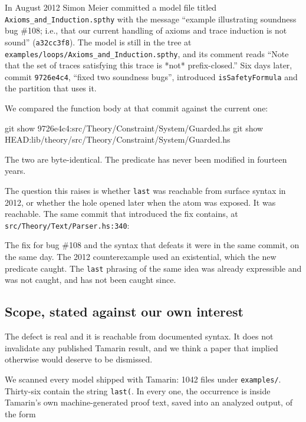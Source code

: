 \documentclass[version=preprint]{iacrcc}
\newcommand{\code}[1]{\texttt{\small #1}}
\theoremstyle{definition}
\theoremstyle{remark}
\begin{document}
In August 2012 Simon Meier committed a model file titled
\code{Axioms\_and\_Induction.spthy} with the message ``example illustrating
soundness bug \#108; i.e., that our current handling of axioms and trace
induction is not sound'' (\code{a32cc3f8}). The model is still in the tree at
\code{examples/loops/Axioms\_and\_Induction.spthy}, and its comment reads
``Note that the set of traces satisfying this trace is *not* prefix-closed.''
Six days later, commit \code{9726e4c4}, ``fixed two soundness bugs'',
introduced \code{isSafetyFormula} and the partition that uses it.

We compared the function body at that commit against the current one:

\begin{outlisting}
	git show 9726e4c4:src/Theory/Constraint/System/Guarded.hs
	git show HEAD:lib/theory/src/Theory/Constraint/System/Guarded.hs
\end{outlisting}

The two are byte-identical. The predicate has never been modified in fourteen
years.

The question this raises is whether \code{last} was reachable from surface
syntax in 2012, or whether the hole opened later when the atom was exposed. It
was reachable. The same commit that introduced the fix contains, at
\code{src/Theory/Text/Parser.hs:340}:

\begin{hslisting}
[ Last <$> try (symbol "last" *> parens nodevarTerm) <?> "last atom"
	\end{hslisting}

	The fix for bug \#108 and the syntax that defeats it were in the same commit,
	on the same day. The 2012 counterexample used an existential, which the new
	predicate caught. The \code{last} phrasing of the same idea was already
	expressible and was not caught, and has not been caught since.

	\subsection{Scope, stated against our own interest}\label{sec:scope}

	The defect is real and it is reachable from documented syntax. It does not
	invalidate any published Tamarin result, and we think a paper that implied
	otherwise would deserve to be dismissed.

	We scanned every model shipped with Tamarin: 1042 files under
	\code{examples/}. Thirty-six contain the string \code{last(}. In every one, the
	occurrence is inside Tamarin's own machine-generated proof text, saved into an
	analyzed output, of the form
\end{document}
